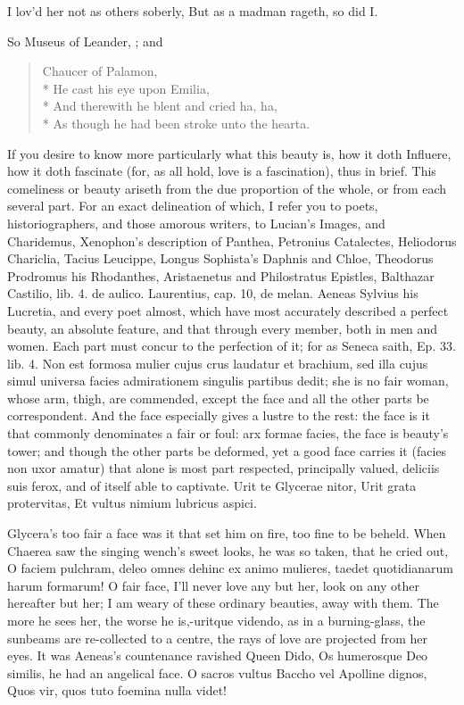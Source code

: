 {I lov'd her not as others soberly,
But as a madman rageth, so did I.

So Museus of Leander, ; and

\begin{verse}
Chaucer of Palamon,\\*
He cast his eye upon Emilia,\\*
And therewith he blent and cried ha, ha,\\*
As though he had been stroke unto the hearta.
\end{verse}

If you desire to know more particularly what this beauty is, how it
doth Influere, how it doth fascinate (for, as all hold, love is a
fascination), thus in brief. This comeliness or beauty ariseth
from the due proportion of the whole, or from each several part. For an
exact delineation of which, I refer you to poets, historiographers, and
those amorous writers, to Lucian's Images, and Charidemus, Xenophon's
description of Panthea, Petronius Catalectes, Heliodorus Chariclia,
Tacius Leucippe, Longus Sophista's Daphnis and Chloe, Theodorus
Prodromus his Rhodanthes, Aristaenetus and Philostratus Epistles,
Balthazar Castilio, lib. 4. de aulico. Laurentius, cap. 10, de melan.
Aeneas Sylvius his Lucretia, and every poet almost, which have most
accurately described a perfect beauty, an absolute feature, and that
through every member, both in men and women. Each part must concur to
the perfection of it; for as Seneca saith, Ep. 33. lib. 4. Non est
formosa mulier cujus crus laudatur et brachium, sed illa cujus simul
universa facies admirationem singulis partibus dedit; she is no fair
woman, whose arm, thigh, \etc{} are commended, except the face and all the
other parts be correspondent. And the face especially gives a lustre to
the rest: the face is it that commonly denominates a fair or foul: arx
formae facies, the face is beauty's tower; and though the other parts
be deformed, yet a good face carries it (facies non uxor amatur) that
alone is most part respected, principally valued, deliciis suis ferox,
and of itself able to captivate.
Urit te Glycerae nitor,
Urit grata protervitas,
Et vultus nimium lubricus aspici.

Glycera's too fair a face was it that set him on fire, too fine to be
beheld. When Chaerea saw the singing wench's sweet looks, he was
so taken, that he cried out, O faciem pulchram, deleo omnes dehinc ex
animo mulieres, taedet quotidianarum harum formarum! O fair face, I'll
never love any but her, look on any other hereafter but her; I am weary
of these ordinary beauties, away with them. The more he sees her, the
worse he is,-uritque videndo, as in a burning-glass, the sunbeams are
re-collected to a centre, the rays of love are projected from her eyes.
It was Aeneas's countenance ravished Queen Dido, Os humerosque Deo
similis, he had an angelical face.
O sacros vultus Baccho vel Apolline dignos,
Quos vir, quos tuto foemina nulla videt!

}
